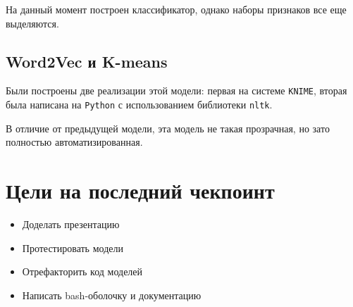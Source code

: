 \documentclass{article}
\begin{document}
На данный момент построен классификатор, однако наборы признаков все еще выделяются. 

\subsection{Word2Vec и K-means}
Были построены две реализации этой модели: первая на системе \texttt{KNIME}, вторая была написана на \texttt{Python} с 
использованием библиотеки \texttt{nltk}.

В отличие от предыдущей модели, эта модель не такая прозрачная, но зато полностью автоматизированная. 

\section{Цели на последний чекпоинт}
\begin{itemize}
    \item Доделать презентацию
    \item Протестировать модели
    \item Отрефакторить код моделей
    \item Написать bash-оболочку и документацию
\end{itemize}
\end{document}
